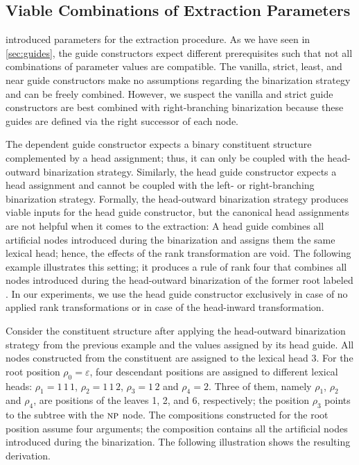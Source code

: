 \documentclass[../../document.tex]{subfiles}
\begin{document}
    \subsection{Viable Combinations of Extraction Parameters}\label{sec:viable-paramters}
     introduced parameters for the extraction procedure.
    As we have seen in \cref{sec:guides}, the guide constructors expect different prerequisites such that not all combinations of parameter values are compatible.
    The vanilla, strict, least, and near guide constructors make no assumptions regarding the binarization strategy and can be freely combined.
    However, we suspect the vanilla and strict guide constructors are best combined with right-branching binarization because these guides are defined via the right successor of each node.

    The dependent guide constructor expects a binary constituent structure complemented by a head assignment; thus, it can only be coupled with the head-outward binarization strategy.
    Similarly, the head guide constructor expects a head assignment and cannot be coupled with the left- or right-branching binarization strategy.
    Formally, the head-outward binarization strategy produces viable inputs for the head guide constructor, but the canonical head assignments are not helpful when it comes to the extraction:
        A head guide combines all artificial nodes introduced during the binarization and assigns them the same lexical head; hence, the effects of the rank transformation are void.
    The following example illustrates this setting; it produces a rule of rank four that combines all nodes introduced during the head-outward binarization of the former root labeled .
    In our experiments, we use the head guide constructor exclusively in case of no applied rank transformations or in case of the head-inward transformation.

    \begin{wrapfigure}[7]{r}{0pt}
        
    \end{wrapfigure}
    Consider the constituent structure after applying the head-outward binarization strategy from the previous example and the values assigned by its head guide.
    All nodes constructed from the  constituent are assigned to the lexical head \(3\).
    For the root position $\rho_0 = \varepsilon$, four descendant positions are assigned to different lexical heads: $\rho_1 = 1\,1\,1$, $\rho_2=1\,1\,2$, $\rho_3 =1\,2$ and $\rho_4=2$.
    Three of them, namely $\rho_1$, $\rho_2$ and $\rho_4$, are positions of the leaves 1, 2, and 6, respectively; the position \(\rho_3\) points to the subtree with the $\textsc{np}$ node.
    The compositions constructed for the root position assume four arguments; the  composition contains all the artificial nodes introduced during the binarization.
    The following illustration shows the resulting derivation.
    \begin{center}
        
    \end{center}
    \exampleqed
\end{document}
